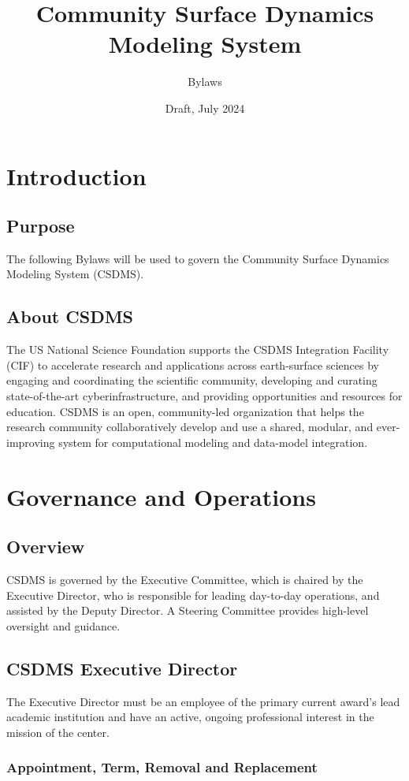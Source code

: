 \documentclass[11pt, oneside]{article}   	%
\title{Community Surface Dynamics Modeling System}
\author{Bylaws}
\date{Draft, July 2024}							%
\def\article#1{
\renewcommand{\thesection}{Article \Roman{section}} 
\section[Article]{#1}
\renewcommand{\thesection}{\Roman{section}} 
}
\begin{document}
\maketitle



\article{Introduction}

\subsection{Purpose}

The following Bylaws will be used to govern the Community Surface Dynamics Modeling System (CSDMS). 

\subsection{About CSDMS}

The US National Science Foundation supports the CSDMS Integration Facility (CIF) to accelerate research and applications across earth-surface sciences by engaging and coordinating the scientific community, developing and curating state-of-the-art cyberinfrastructure, and providing opportunities and resources for education. CSDMS is an open, community-led organization that helps the research community collaboratively develop and use a shared, modular, and ever-improving system for computational modeling and data-model integration.


\article{Governance and Operations}

\subsection{Overview}

CSDMS is governed by the Executive Committee, which is chaired by the Executive Director, who is responsible for leading day-to-day operations, and assisted by the Deputy Director. A Steering Committee provides high-level oversight and guidance.


\subsection{CSDMS Executive Director}

The Executive Director must be an employee of the primary current award's lead academic institution and have an active, ongoing professional interest in the mission of the center. 

\subsubsection{Appointment, Term, Removal and Replacement}
\end{document}

